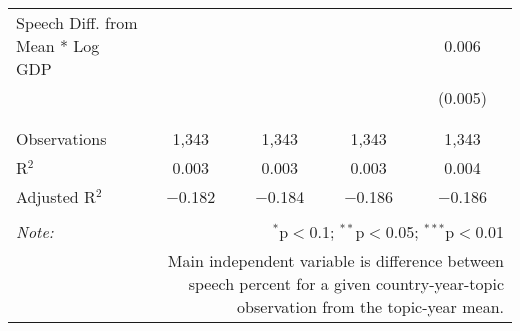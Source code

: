 \begin{table}[!htbp]
\begin{tabular}{@{\extracolsep{5pt}}lcccc}
 Speech Diff. from Mean * Log GDP &  &  &  & 0.006 \\ 
  &  &  &  & (0.005) \\ 
  & & & & \\ 
\hline \\[-1.8ex] 
Observations & 1,343 & 1,343 & 1,343 & 1,343 \\ 
R$^{2}$ & 0.003 & 0.003 & 0.003 & 0.004 \\ 
Adjusted R$^{2}$ & $-$0.182 & $-$0.184 & $-$0.186 & $-$0.186 \\ 
\hline 
\hline \\[-1.8ex] 
\textit{Note:}  & \multicolumn{4}{r}{$^{*}$p$<$0.1; $^{**}$p$<$0.05; $^{***}$p$<$0.01} \\ 
 & \multicolumn{4}{r}{Main independent variable is difference between speech percent for a given country-year-topic observation from the topic-year mean.} \\ 
\end{tabular} 
\end{table} 
